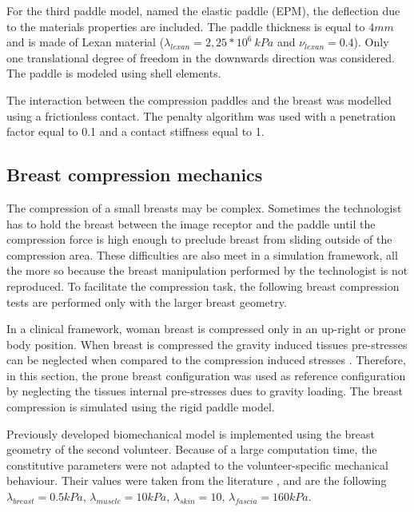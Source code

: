 For the third paddle model, named the elastic paddle (EPM), the deflection due to the materials properties are included. The paddle thickness is equal to $4mm$ and is made of Lexan material ($\lambda_{lexan}= 2,25*10^6 \ kPa$ and $\nu_{lexan}= 0.4$).   Only one translational degree of freedom in the downwards direction was considered. The paddle is modeled using shell elements. 

The interaction between the compression paddles and the breast was modelled using a frictionless contact. The penalty algorithm was used with a penetration factor equal to 0.1 and a contact stiffness equal to 1. 
 
\subsection{Breast compression mechanics}

The compression of a small breasts may be complex. Sometimes the technologist has to hold the breast between the image receptor and the paddle until the compression force is high enough to preclude breast from sliding outside of the compression area. These difficulties are also meet in a simulation framework, all the more so because the breast manipulation performed by the technologist is not reproduced. To facilitate the compression task, the following breast compression tests are performed only with the larger breast geometry.

In a clinical framework, woman breast is compressed only in an up-right or prone body position. When breast is compressed the gravity induced tissues pre-stresses can be neglected when compared to the compression induced stresses \citep{han_development_2012, ruiter_model_based_2006, sturgeon_finite_element_2016}.  Therefore, in this section, the prone breast configuration was used as reference configuration by neglecting the tissues internal pre-stresses dues to gravity loading. The breast compression is simulated using the rigid paddle model. 

Previously developed biomechanical model is implemented using the breast geometry of the second volunteer. Because of a large computation time, the constitutive parameters were not adapted to the volunteer-specific mechanical behaviour. Their values were taken from the literature \citep{han_nonlinear_2014,rajagopal_modelling_2007,gefen_mechanics_2007}, and are the following $\lambda_{breast}=0.5 kPa$, $\lambda_{muscle}= 10kPa$, $\lambda_{skin}=10$, $\lambda_{fascia}= 160kPa$.    

